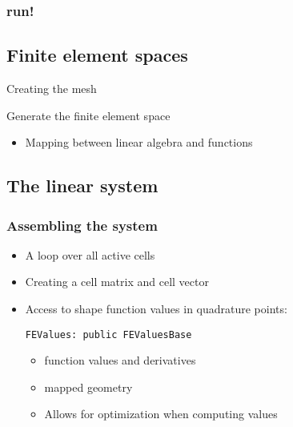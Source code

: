 \begin{frame}
  \frametitle{run!}
  \begin{block}{}
  
  \end{block}
\end{frame}

\subsection{Finite element spaces}
\begin{frame}
  \begin{block}{Creating the mesh}
  
  \end{block}
\end{frame}

\begin{frame}
  \begin{block}{Generate the finite element space}
  
  \end{block}
  \begin{itemize}
  \item Mapping between linear algebra and functions
  \end{itemize}
\end{frame}

\subsection{The linear system}
\begin{frame}
  \frametitle{Assembling the system}
  \begin{itemize}
  \item<+-> A loop over all active cells
  \item<+-> Creating a cell matrix and cell vector
  \item<+-> Access to shape function values in quadrature points:
    \begin{block}{\lstinline!FEValues: public FEValuesBase!}
    \begin{itemize}
    \item function values and derivatives
    \item mapped geometry
    \item Allows for optimization when computing values
    \end{itemize}
    \end{block}
  \end{itemize}
\end{frame}

